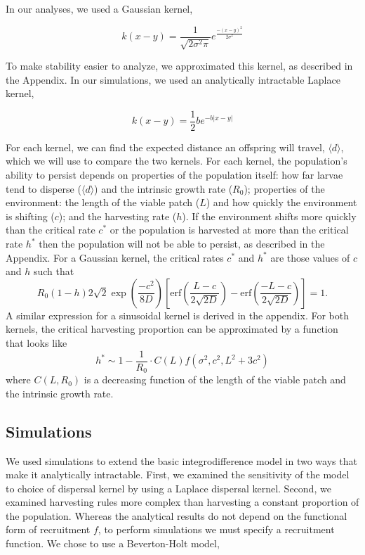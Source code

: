 \documentclass[]{article}
\begin{document}
In our analyses, we used a Gaussian kernel,

\[k(x-y)=\frac{1}{\sqrt{2\sigma^2\pi}}e^{\frac{-(x-y)^2}{2\sigma^2}}\]

\noindent To make stability easier to analyze, we approximated this kernel, as described in the Appendix. In our 
simulations, we used an analytically intractable Laplace kernel,

\[k(x-y)=\frac{1}{2}be^{-b\vert x-y\vert}\]

\noindent For each kernel, we can find the expected distance an offspring will travel, $\langle d \rangle$, which we will use to compare the two kernels.  For each kernel, the population's ability to persist depends on properties of the population itself: how far larvae 
tend to disperse ($\langle d \rangle$) and the intrinsic growth rate ($R_0$); properties of the environment: the 
length of the viable patch ($L$) and how quickly the environment is shifting ($c$); and the harvesting rate ($h
$). If the environment shifts more quickly than the critical rate $c^*$ or the population is harvested at more than 
the critical rate $h^*$ then the population will not be able to persist, as described in the Appendix.  For a Gaussian kernel, the critical rates $c^*$ and $h^*$ are those values of $c$ and $h$ such that 
$$R_0(1-h)2\sqrt{2}\exp\left(\frac{-c^2}{8D}\right)\left[\text{erf}\left(\frac{L-c}{2\sqrt{2D}}\right)-\text{erf}\left(\frac{-L-c}{2\sqrt{2D}}\right)\right]=1.$$
A similar expression for a sinusoidal kernel is derived in the appendix.  For both kernels, the critical harvesting proportion can be approximated by a function that looks like 
\begin{equation}
h^*\sim1- \frac{1}{R_0}\cdot C(L)f(\sigma^2,c^2,L^2+3c^2)
\end{equation}
where $C(L,R_0)$ is a decreasing function of the length of the viable patch and the intrinsic growth rate.


\subsection{Simulations }

We used simulations to extend the basic integrodifference model in two ways that make it analytically 
intractable. First, we examined the sensitivity of the model to choice of dispersal kernel by using a Laplace 
dispersal kernel. Second, we examined harvesting rules more complex than harvesting a constant proportion of the population. Whereas the 
analytical results do not depend on the functional form of recruitment $f$, to perform simulations we must 
specify a recruitment function. We chose to use a Beverton-Holt model,
\end{document}
